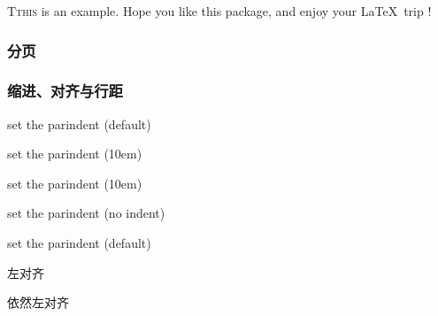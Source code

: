 \documentclass[twoside]{ctexart} %
\begin{document}
            \lettrine{T}{this} is an example. Hope you like this package, and enjoy your \LaTeX\ trip !
            
        \subsubsection{分页}
            \newpage %
            \mbox{}
            \newpage
        
        \subsubsection{缩进、对齐与行距}
            set the parindent (default)
        
            {\setlength{\parindent}{10em} set the parindent (10em)

            set the parindent (10em)}

            \noindent set the parindent (no indent)

            set the parindent (default)

            \begin{flushleft}
                左对齐

                依然左对齐
            \end{flushleft}
\end{document}
